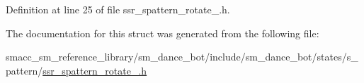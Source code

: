 Definition at line 25 of file ssr\+\_\+spattern\+\_\+rotate\+\_.\+h.




The documentation for this struct was generated from the following file\+:\begin{DoxyCompactItemize}
\item 
smacc\+\_\+sm\+\_\+reference\+\_\+library/sm\+\_\+dance\+\_\+bot/include/sm\+\_\+dance\+\_\+bot/states/s\+\_\+pattern/\hyperlink{ssr__spattern__rotate__2_8h}{ssr\+\_\+spattern\+\_\+rotate\+\_.\+h}\end{DoxyCompactItemize}
